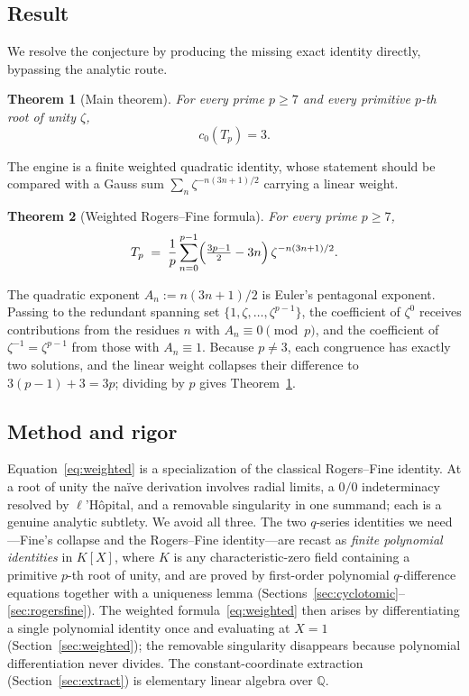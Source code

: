 \documentclass[11pt]{article}
\newtheorem{theorem}{Theorem}[section]
\theoremstyle{definition}
\newcommand{\Q}{\mathbb{Q}}
\begin{document}
\subsection*{Result}
We resolve the conjecture by producing the missing exact identity directly, bypassing the analytic route.

\begin{theorem}[Main theorem]\label{thm:main}
For every prime $p\ge 7$ and every primitive $p$-th root of unity $\zeta$,
\[
  c_0(T_p)=3 .
\]
\end{theorem}

The engine is a finite weighted quadratic identity, whose statement should be compared with a Gauss sum $\sum_n \zeta^{-n(3n+1)/2}$ carrying a linear weight.

\begin{theorem}[Weighted Rogers--Fine formula]\label{thm:weighted}
For every prime $p\ge 7$,
\begin{equation}\label{eq:weighted}
  T_p \;=\; \frac1p\sum_{n=0}^{p-1}\Bigl(\tfrac{3p-1}{2}-3n\Bigr)\,\zeta^{-n(3n+1)/2}.
\end{equation}
\end{theorem}

The quadratic exponent $A_n:=n(3n+1)/2$ is Euler's pentagonal exponent. Passing to the redundant spanning set $\{1,\zeta,\dots,\zeta^{p-1}\}$, the coefficient of $\zeta^{0}$ receives contributions from the residues $n$ with $A_n\equiv 0\pmod p$, and the coefficient of $\zeta^{-1}=\zeta^{p-1}$ from those with $A_n\equiv 1$. Because $p\ne 3$, each congruence has exactly two solutions, and the linear weight collapses their difference to $3(p-1)+3=3p$; dividing by $p$ gives Theorem~\ref{thm:main}.

\subsection*{Method and rigor}
Equation~\eqref{eq:weighted} is a specialization of the classical Rogers--Fine identity. At a root of unity the na\"ive derivation involves radial limits, a $0/0$ indeterminacy resolved by $\ell$'H\^opital, and a removable singularity in one summand; each is a genuine analytic subtlety. We avoid all three. The two $q$-series identities we need---Fine's collapse and the Rogers--Fine identity---are recast as \emph{finite polynomial identities} in $K[X]$, where $K$ is any characteristic-zero field containing a primitive $p$-th root of unity, and are proved by first-order polynomial $q$-difference equations together with a uniqueness lemma (Sections~\ref{sec:cyclotomic}--\ref{sec:rogersfine}). The weighted formula~\eqref{eq:weighted} then arises by differentiating a single polynomial identity once and evaluating at $X=1$ (Section~\ref{sec:weighted}); the removable singularity disappears because polynomial differentiation never divides. The constant-coordinate extraction (Section~\ref{sec:extract}) is elementary linear algebra over $\Q$.
\end{document}
